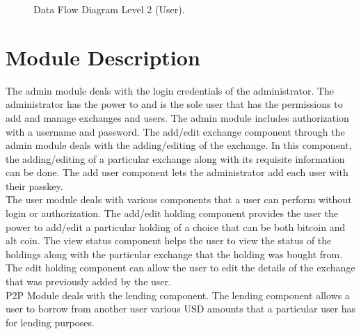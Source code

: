 \documentclass[11pt]{report}
\begin{document}
\begin{figure}[H]
	\caption{Data Flow Diagram Level 2 (User).}
\end{figure}
\section{Module Description}
The admin module deals with the login credentials of the administrator. The administrator has the power to and is the sole user that has the permissions to add  and manage exchanges and users. The admin module includes authorization with a username and password.
The add/edit exchange component through the admin module deals with the adding/editing of the exchange. In this component, the adding/editing of a particular exchange along with its requisite information can be done.
The add user component lets the administrator add each user with their passkey. \\
The user module deals with various components that a user can perform without login or authorization.
The add/edit holding component provides the user the power to add/edit a particular holding of a choice that can be both bitcoin and alt coin.
The view status component helps the user to view the status of the holdings along with the particular exchange that the holding was bought from.
The edit holding component can allow the user to edit the details of the exchange that was previously added by the user.\\
P2P Module deals with the lending component.
The lending component allows a user to borrow from another user various USD amounts that a particular user has for lending purposes.
\end{document}
